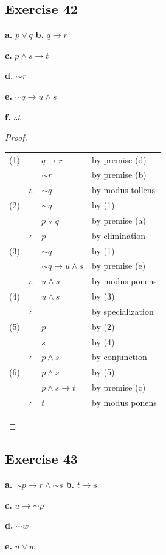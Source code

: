 \documentclass[14pt]{extarticle}
\begin{document}
\subsection{Exercise 42} {\bf a.} $p \vee q$
{\bf b.} $q \to r$

{\bf c.} $p \wedge s \to t$

{\bf d.} ${\sim r}$

{\bf e.} ${\sim q} \to u \wedge s$

{\bf f.} $\therefore t$

\begin{proof} \begin{tabular}{rrll} (1) & & $q \to r$ & by premise (d) \\ & &
${\sim r}$ & by premise (b) \\ & $\therefore$ & ${\sim q}$ & by modus tollens \\
(2) & & ${\sim q}$ & by (1) \\ & & $p \vee q$ & by premise (a) \\ & $\therefore$
& $p$ & by elimination \\ (3) & & ${\sim q}$ & by (1) \\ & & ${\sim q} \to u
\wedge s$ & by premise (e) \\ & $\therefore$ & $u \wedge s$ & by modus ponens \\
(4) & & $u \wedge s$ & by (3) \\ & $\therefore$ & $ $ & by specialization \\ (5)
& & $p$ & by (2) \\ & & $s$ & by (4) \\ & $\therefore$ & $p \wedge s$ & by
conjunction \\ (6) & & $p \wedge s$ & by (5) \\ & & $p \wedge s \to t$ & by
premise (c) \\ & $\therefore$ & $t$ & by modus ponens \\ \end{tabular}
\end{proof}

\subsection{Exercise 43} {\bf a.} ${\sim p} \to r \wedge {\sim s}$
{\bf b.} $t \to s$

{\bf c.} $u \to {\sim p}$

{\bf d.} ${\sim w}$

{\bf e.} $u \vee w$
\end{document}
